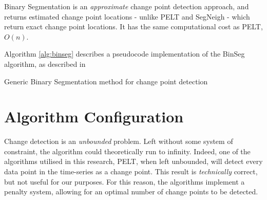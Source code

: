 \documentclass[../main.tex]{subfiles}
\begin{document}
Binary Segmentation is an \emph{approximate} change point detection approach, and returns estimated change point locations - unlike PELT and SegNeigh - which return exact change point locations. It has the same computational cost as PELT, $O(n)$.

Algorithm \autoref{alg:binseg} describes a pseudocode implementation of the BinSeg algorithm, as described in \cite{Eckley2011}\newline

\begin{algorithm}[H]
    \label{alg:binseg}
    \caption{Generic Binary Segmentation method for change point detection}
    \DontPrintSemicolon
    \bigskip
\end{algorithm}

\section{Algorithm Configuration}

Change detection is an \emph{unbounded} problem. Left without some system of constraint, the algorithm could theoretically run to infinity. Indeed, one of the algorithms utilised in this research, PELT, when left unbounded, will detect every data point in the time-series as a change point. This result is \textit{technically} correct, but not useful for our purposes. For this reason, the algorithms implement a penalty system, allowing for an optimal number of change points to be detected.
\end{document}
